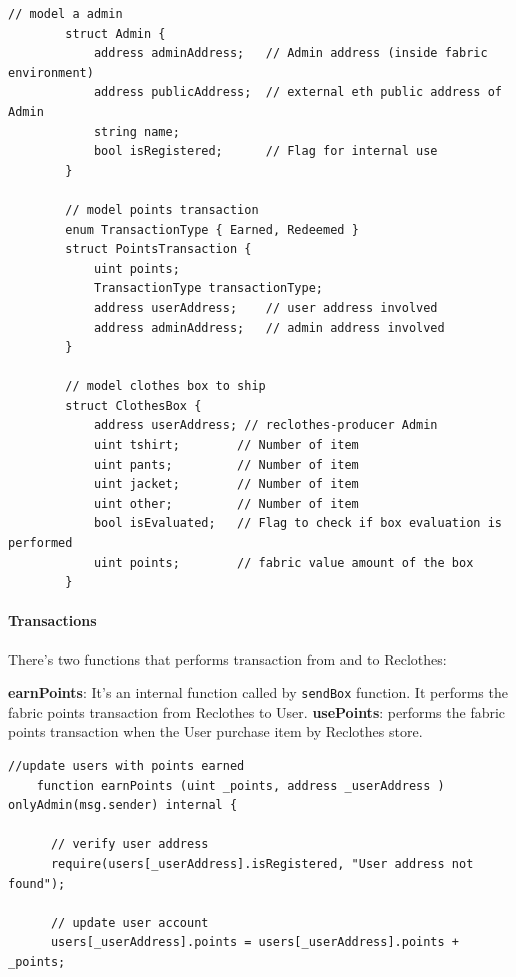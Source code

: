 {\begin{lstlisting}[language=Solidity]
        // model a admin
        struct Admin {
            address adminAddress;   // Admin address (inside fabric environment)
            address publicAddress;  // external eth public address of Admin
            string name;
            bool isRegistered;      // Flag for internal use
        }
    
        // model points transaction
        enum TransactionType { Earned, Redeemed }
        struct PointsTransaction {
            uint points;
            TransactionType transactionType;
            address userAddress;    // user address involved
            address adminAddress;   // admin address involved
        }
    
        // model clothes box to ship
        struct ClothesBox {
            address userAddress; // reclothes-producer Admin
            uint tshirt;        // Number of item
            uint pants;         // Number of item
            uint jacket;        // Number of item
            uint other;         // Number of item
            bool isEvaluated;   // Flag to check if box evaluation is performed
            uint points;        // fabric value amount of the box
        }
\end{lstlisting}

\paragraph{Transactions}

There's two functions that performs transaction from and to Reclothes:

\begin{outline}[enumerate]
    \1 \textbf{earnPoints}: It's an internal function called by \texttt{sendBox} function. 
    It performs the fabric points transaction from Reclothes to User.
    \1 \textbf{usePoints}: performs the fabric points transaction when the User purchase item by 
    Reclothes store.
\end{outline}

\begin{lstlisting}[language=Solidity]
    //update users with points earned
    function earnPoints (uint _points, address _userAddress ) onlyAdmin(msg.sender) internal {

      // verify user address
      require(users[_userAddress].isRegistered, "User address not found");

      // update user account
      users[_userAddress].points = users[_userAddress].points + _points;


\end{lstlisting}}
